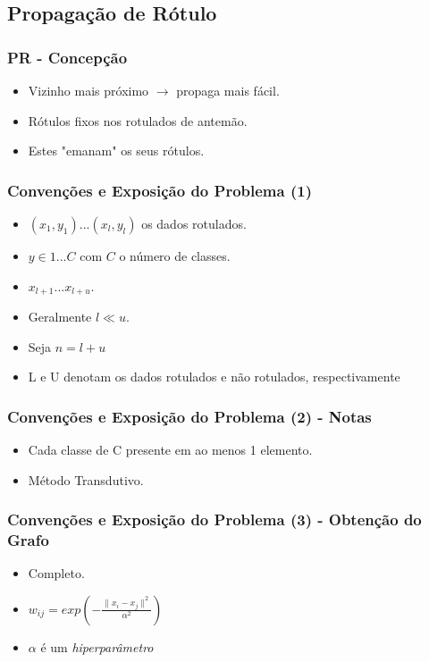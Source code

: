 \documentclass{beamer}
\begin{document}
    \subsection{Propagação de Rótulo}
      \frame{\tableofcontents[current]}

      \frame
      {
        \frametitle{PR - Concepção}
        \begin{itemize}
          \item <1-> Vizinho mais próximo $\rightarrow$ propaga mais fácil.
          \item <2-> Rótulos fixos nos rotulados de antemão.
          \item <3-> Estes "emanam" os seus rótulos.
        \end{itemize}
      }

      \frame
      {
        \frametitle{Convenções e Exposição do Problema (1)}
        \begin{itemize}
          \item <1-> ${(x_1,y_1)...(x_l,y_l)}$ os dados rotulados.
          \item <2-> $y \in {1...C}$ com $C$ o número de classes.
          \item <3-> ${x_{l+1}...x_{l+u}}$.
          \item <4-> Geralmente $l \ll u$.
          \item <5-> Seja $n = l + u$
          \item <6-> L e U denotam os dados rotulados e não rotulados, respectivamente
        \end{itemize}
      }

      \frame
      {
        \frametitle{Convenções e Exposição do Problema (2) - Notas}
        \begin{itemize}
          \item <1-> Cada classe de C presente em ao menos 1 elemento.
          \item <2-> Método Transdutivo.
        \end{itemize}
      }

      \frame
      {
        \frametitle{Convenções e Exposição do Problema (3) - Obtenção do Grafo}
        \begin{itemize}
          \item <1-> Completo.
          \item <2-> $w_{ij} = exp( -\frac{\| x_i - x_j \|^2}{\alpha^2} )$
          \item <3-> $\alpha$ é um \emph{hiperparâmetro}
        \end{itemize}
      }  
\end{document}
